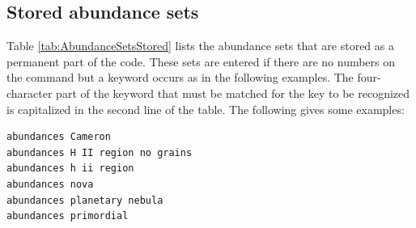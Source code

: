 \subsection{Stored abundance sets}

Table \ref{tab:AbundanceSetsStored} lists the abundance sets
that are stored as a permanent part of the code.
These sets are entered if there are no numbers on the
 command but a keyword occurs
as in the following examples.
The four-character part of the keyword that must be matched
for the  key to be recognized is capitalized in the second line of the
table.
The following gives some examples:
\begin{verbatim}
abundances Cameron
abundances H II region no grains
abundances h ii region
abundances nova
abundances planetary nebula
abundances primordial
\end{verbatim}

